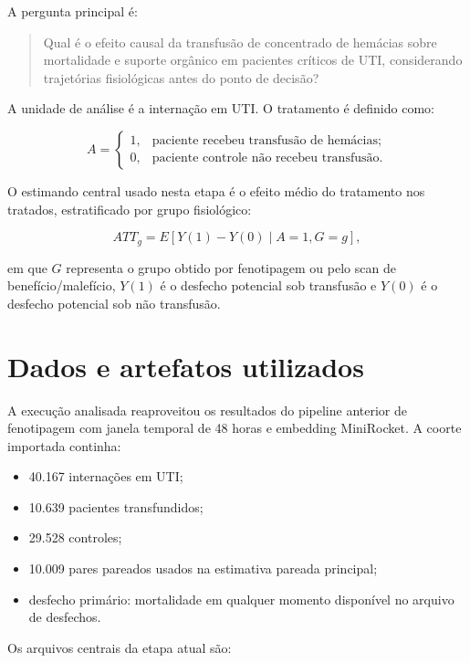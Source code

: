 \documentclass[12pt,a4paper]{article}
\begin{document}
A pergunta principal \'e:

\begin{quote}
Qual \'e o efeito causal da transfus\~ao de concentrado de hem\'acias sobre mortalidade e suporte org\^anico em pacientes cr\'iticos de UTI, considerando trajet\'orias fisiol\'ogicas antes do ponto de decis\~ao?
\end{quote}

A unidade de an\'alise \'e a interna\c{c}\~ao em UTI. O tratamento \'e definido como:

\[
A =
\begin{cases}
1, & \text{paciente recebeu transfus\~ao de hem\'acias;}\\
0, & \text{paciente controle n\~ao recebeu transfus\~ao.}
\end{cases}
\]

O estimando central usado nesta etapa \'e o efeito m\'edio do tratamento nos tratados, estratificado por grupo fisiol\'ogico:

\[
ATT_g = E[Y(1)-Y(0) \mid A=1, G=g],
\]

em que $G$ representa o grupo obtido por fenotipagem ou pelo scan de benef\'icio/malef\'icio, $Y(1)$ \'e o desfecho potencial sob transfus\~ao e $Y(0)$ \'e o desfecho potencial sob n\~ao transfus\~ao.

\section{Dados e artefatos utilizados}

A execu\c{c}\~ao analisada reaproveitou os resultados do pipeline anterior de fenotipagem com janela temporal de 48 horas e embedding MiniRocket. A coorte importada continha:

\begin{itemize}
    \item 40.167 interna\c{c}\~oes em UTI;
    \item 10.639 pacientes transfundidos;
    \item 29.528 controles;
    \item 10.009 pares pareados usados na estimativa pareada principal;
    \item desfecho prim\'ario: mortalidade em qualquer momento dispon\'ivel no arquivo de desfechos.
\end{itemize}

Os arquivos centrais da etapa atual s\~ao:
\end{document}
